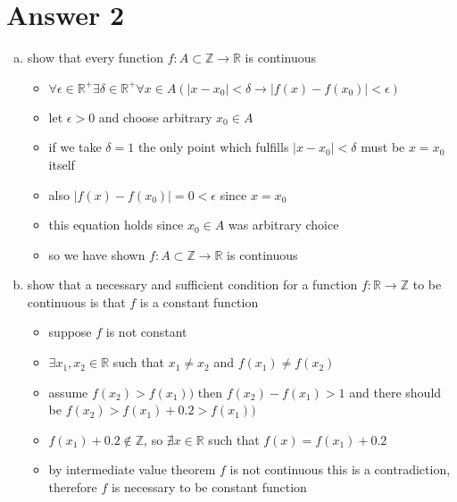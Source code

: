 \documentclass[12pt]{article}
\begin{document}
\section*{Answer 2}
\begin{enumerate}[a)]
    \item show that every function $f : A \subset \mathbb{Z} \rightarrow \mathbb{R} $ is continuous
    \begin{itemize}
        \item $\forall \epsilon \in \mathbb{R}^{+} \exists \delta \in \mathbb{R}^{+} \forall x \in A (|x-x_{0}| < \delta \rightarrow |f(x) - f(x_{0})| < \epsilon )$
        \item let $\epsilon > 0$ and choose arbitrary  $ x_{0} \in A$
        \item if we take $\delta = 1$ the only point which fulfills $|x-x_{0}| < \delta$ must be $x= x_{0}$ itself
        \item also $|f(x) - f(x_{0})| = 0 < \epsilon$ since $x = x_{0}$
        \item this equation holds since $x_{0} \in A$ was arbitrary choice
        \item so we have shown $f : A \subset \mathbb{Z} \rightarrow \mathbb{R}$ is continuous
    \end{itemize}
    \item show that a necessary and sufficient condition for a function $f : \mathbb{R} \rightarrow \mathbb{Z} $ to be continuous is that $f$ is a constant function
    \begin{itemize}
        \item suppose $f$ is not constant
        \item $\exists x_{1}, x_{2} \in \mathbb{R}$ such that $x_{1} \neq x_{2}$ and $f(x_{1}) \neq f(x_{2})$
        \item assume $f(x_{2})  > f(x_{1}))$ then $f(x_{2}) - f(x_{1}) > 1$ and there should be $f(x_{2}) >f(x_{1})+ 0.2 > f(x_{1}))$
        \item $f(x_{1})+0.2 \notin \mathbb{Z}$, so $\nexists x \in \mathbb{R}$ such that $f(x) = f(x_{1}) + 0.2$
        \item by intermediate value theorem $f$ is not continuous this is a contradiction, therefore $f$ is necessary to be constant function 
    \end{itemize}
\end{enumerate}
\end{document}
